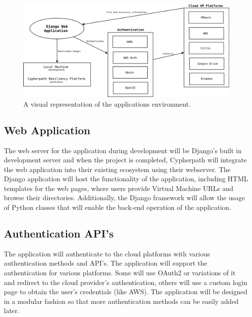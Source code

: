 \documentclass{article}
\begin{document}
    \begin{figure}[h]
    \includegraphics[scale=.4]{downloader_env}
        \caption{A visual representation of the applications environment.}
    \end{figure}


        \subsection{Web Application}
        The web server for the application during development will be Django's built in development server and when the project is completed, Cypherpath will integrate
        the web application into their existing ecosystem using their webserver. The Django application will host the functionality of the application, including HTML templates for the 
        web pages, where users provide Virtual Machine URLs and browse their directories. Additionally, the Django framework will allow the usage of Python classes that will enable the 
        back-end operation of the application.

        
        \subsection{Authentication API's}
        The application will authenticate to the cloud platforms with various authentication methods and API's. The application will support
        the authentication for various platforms. Some will use OAuth2 or variations of it and redirect to the cloud provider's authentication, others will use a custom
        login page to obtain the user's credentials (like AWS). The application will be designed in a modular fashion so that more authentication methods can be easily added later.
\end{document}
